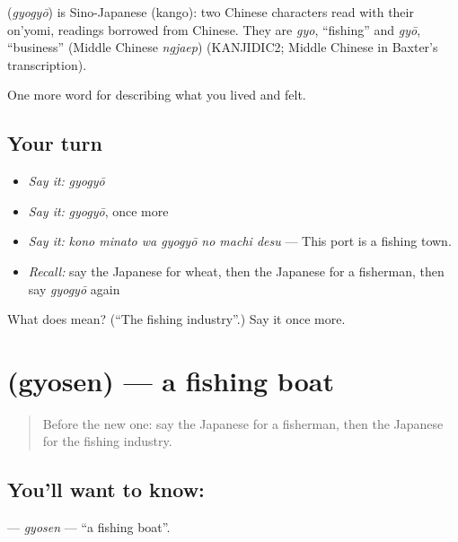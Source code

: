 \begin{cousinweb}
\textbf{} (\emph{gyogyō}) is Sino-Japanese (kango): two Chinese characters read with their on'yomi, readings borrowed from Chinese. They are \emph{gyo}, \textquotedblleft{}fishing\textquotedblright{} and \emph{gyō}, \textquotedblleft{}business\textquotedblright{} (Middle Chinese \emph{ngjaep}) (KANJIDIC2; Middle Chinese in Baxter's transcription).
\end{cousinweb}

\begin{grammarlens}[title={What you've built}]
One more word for describing what you lived and felt.
\end{grammarlens}

\subsection*{Your turn}
\begin{itemize}
\raggedright
  \item \emph{Say it:} \emph{gyogyō}
  \item \emph{Say it:} \emph{gyogyō}, once more
  \item \emph{Say it:} \emph{kono minato wa gyogyō no machi desu} — This port is a fishing town.
  \item \emph{Recall:} say the Japanese for wheat, then the Japanese for a fisherman, then say \emph{gyogyō} again
\end{itemize}

\begin{tcolorbox}[breakable,colback=teal!4,colframe=teal!35!black,title={Before you move on}]
What does  mean? (\textquotedblleft{}The fishing industry\textquotedblright{}.) Say it once more.
\end{tcolorbox}
\section[\texorpdfstring{\ja{ぎょせん} (gyosen)}{ぎょせん (gyosen)}]{ (gyosen) — a fishing boat}

\label{lesson:JA-C490-gyosen}



\begin{quote}
Before the new one: say the Japanese for a fisherman, then the Japanese for the fishing industry.
\end{quote}

\subsection*{You'll want to know: }
\textbf{} — \emph{gyosen} — \textquotedblleft{}a fishing boat\textquotedblright{}.

